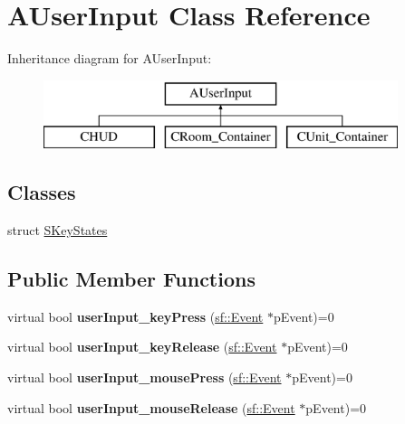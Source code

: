 \hypertarget{classAUserInput}{\section{A\-User\-Input Class Reference}
\label{classAUserInput}
}
Inheritance diagram for A\-User\-Input\-:\begin{figure}[H]
\begin{center}
\leavevmode
\includegraphics[height=2.000000cm]{classAUserInput}
\end{center}
\end{figure}
\subsection*{Classes}
\begin{DoxyCompactItemize}
\item 
struct \hyperlink{structAUserInput_1_1SKeyStates}{S\-Key\-States}
\end{DoxyCompactItemize}
\subsection*{Public Member Functions}
\begin{DoxyCompactItemize}
\item 
\hypertarget{classAUserInput_a110239bcc0461666583d1dc940cb5d13}{virtual bool {\bfseries user\-Input\-\_\-key\-Press} (\hyperlink{classsf_1_1Event}{sf\-::\-Event} $\ast$p\-Event)=0}\label{classAUserInput_a110239bcc0461666583d1dc940cb5d13}

\item 
\hypertarget{classAUserInput_afe8ae22fff673d788e366b9b29ffa67d}{virtual bool {\bfseries user\-Input\-\_\-key\-Release} (\hyperlink{classsf_1_1Event}{sf\-::\-Event} $\ast$p\-Event)=0}\label{classAUserInput_afe8ae22fff673d788e366b9b29ffa67d}

\item 
\hypertarget{classAUserInput_a567e0d0610bd2ef2e23fed64b3e56d2b}{virtual bool {\bfseries user\-Input\-\_\-mouse\-Press} (\hyperlink{classsf_1_1Event}{sf\-::\-Event} $\ast$p\-Event)=0}\label{classAUserInput_a567e0d0610bd2ef2e23fed64b3e56d2b}

\item 
\hypertarget{classAUserInput_a570f71dde4825c3e9bdcf6b58857f514}{virtual bool {\bfseries user\-Input\-\_\-mouse\-Release} (\hyperlink{classsf_1_1Event}{sf\-::\-Event} $\ast$p\-Event)=0}\label{classAUserInput_a570f71dde4825c3e9bdcf6b58857f514}

\end{DoxyCompactItemize}
